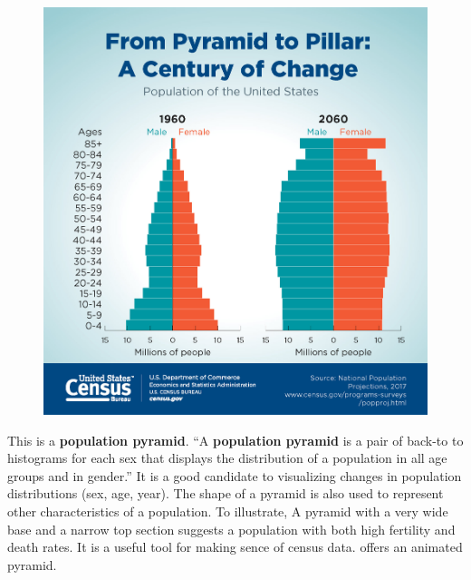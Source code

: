 \documentclass[]{book}
\theoremstyle{definition}
\theoremstyle{definition}
\theoremstyle{definition}
\theoremstyle{remark}
\begin{document}
\begin{figure}
\centering
\includegraphics{images/Pyramid.jpg}
\caption{}
\end{figure}

This is a \textbf{population pyramid}. ``A \textbf{population pyramid}
is a pair of back-to to histograms for each sex that displays the
distribution of a population in all age groups and in gender.'' It is a
good candidate to visualizing changes in population distributions (sex,
age, year). The shape of a pyramid is also used to represent other
characteristics of a population. To illustrate, A pyramid with a very
wide base and a narrow top section suggests a population with both high
fertility and death rates. It is a useful tool for making sence of
census data. \citep{animated_pyramid} offers an animated pyramid.
\end{document}
